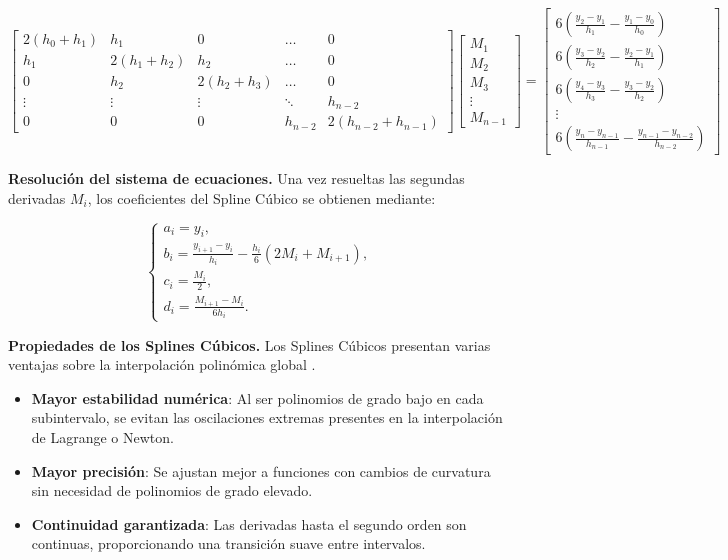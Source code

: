 \documentclass{article}
\begin{document}
\[
\begin{bmatrix}
    2(h_0 + h_1) & h_1 & 0 & \dots & 0 \\
    h_1 & 2(h_1 + h_2) & h_2 & \dots & 0 \\
    0 & h_2 & 2(h_2 + h_3) & \dots & 0 \\
    \vdots & \vdots & \vdots & \ddots & h_{n-2} \\
    0 & 0 & 0 & h_{n-2} & 2(h_{n-2} + h_{n-1})
\end{bmatrix}
\begin{bmatrix}
    M_1 \\
    M_2 \\
    M_3 \\
    \vdots \\
    M_{n-1}
\end{bmatrix}
=
\begin{bmatrix}
    6 \left( \frac{y_2 - y_1}{h_1} - \frac{y_1 - y_0}{h_0} \right) \\
    6 \left( \frac{y_3 - y_2}{h_2} - \frac{y_2 - y_1}{h_1} \right) \\
    6 \left( \frac{y_4 - y_3}{h_3} - \frac{y_3 - y_2}{h_2} \right) \\
    \vdots \\
    6 \left( \frac{y_n - y_{n-1}}{h_{n-1}} - \frac{y_{n-1} - y_{n-2}}{h_{n-2}} \right)
\end{bmatrix}
\]

\textbf{Resolución del sistema de ecuaciones.} Una vez resueltas las segundas derivadas $M_i$, los coeficientes del Spline Cúbico se obtienen mediante:

$$
\begin{cases}
    a_i = y_i, \\
    b_i = \frac{y_{i+1} - y_i}{h_i} - \frac{h_i}{6} (2M_i + M_{i+1}), \\
    c_i = \frac{M_i}{2}, \\
    d_i = \frac{M_{i+1} - M_i}{6h_i}.
\end{cases}
$$

\vspace{5mm}
\noindent \textbf{Propiedades de los Splines Cúbicos.} Los Splines Cúbicos presentan varias ventajas sobre la interpolación polinómica global \cite{splines1, splines3}.

\begin{itemize}
    \item \textbf{Mayor estabilidad numérica}: Al ser polinomios de grado bajo en cada subintervalo, se evitan las oscilaciones extremas presentes en la interpolación de Lagrange o Newton.
    \item \textbf{Mayor precisión}: Se ajustan mejor a funciones con cambios de curvatura sin necesidad de polinomios de grado elevado.
    \item \textbf{Continuidad garantizada}: Las derivadas hasta el segundo orden son continuas, proporcionando una transición suave entre intervalos.
\end{itemize}
\end{document}
